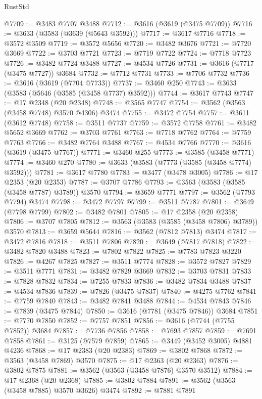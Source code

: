 \begin{lexlean}{RustStd}
\begin{coremodule}
{\begin{coremodule}
{{{{{{{{{{{{{{{{{{{{{{{{{{{{{{{{{{{{{{{{{{{{{@7709 := @3483 @7707 @3488
@7712 := @3616 (@3619 (@3475 @7709))
@7716 := @3633 (@3583 (@3639 (@5643 @3592)))
@7717 := @3617 @7716
@7718 := @3572 @3509
@7719 := @3572 @5656
@7720 := @3482 @3676
@7721 := @7720 @3669
@7722 := @3703 @7721
@7723 := @7719 @7722
@7724 := @7718 @7723
@7726 := @3482 @7724 @3488
@7727 := @4534 @7726
@7731 := @3616 (@7717 (@3475 @7727)) @3684
@7732 := @7712 @7731
@7733 := @7706 @7732
@7736 := @3616 (@3619 (@7704 @7733))
@7737 := @3460 @250
@7743 := @3633 (@3583 (@5646 (@3585 (@3458 @7737) @3592)))
@7744 := @3617 @7743
@7747 := @17 @2348 (@20 @2348)
@7748 := @3565 @7747
@7754 := @3562 (@3563 (@3458 @7748) @3570 @4306) @3474
@7755 := @3472 @7754
@7757 := @3611 (@3612 @7748)
@7758 := @3511 @7737
@7759 := @3572 @7758
@7761 := @3482 @5652 @3669
@7762 := @3703 @7761
@7763 := @7718 @7762
@7764 := @7759 @7763
@7766 := @3482 @7764 @3488
@7767 := @4534 @7766
@7770 := @3616 (@3619 (@3475 @7767))
@7771 := @3460 @255
@7773 := @3585 (@3458 @7771)
@7774 := @3460 @270
@7780 := @3633 (@3583 (@7773 (@3585 (@3458 @7774) @3592)))
@7781 := @3617 @7780
@7783 := @3477 (@3478 @3005)
@7786 := @17 @2353 (@20 @2353)
@7787 := @3707 @7786
@7793 := @3563 (@3583 (@3585 (@3458 @7787) @3789)) @3570
@7794 := @3659 @7771
@7797 := @3562 (@7793 @7794) @3474
@7798 := @3472 @7797
@7799 := @3511 @7787
@7801 := @3649 (@7798 @7799)
@7802 := @3482 @7801
@7805 := @17 @2358 (@20 @2358)
@7806 := @3707 @7805
@7812 := @3563 (@3583 (@3585 (@3458 @7806) @3789)) @3570
@7813 := @3659 @5644
@7816 := @3562 (@7812 @7813) @3474
@7817 := @3472 @7816
@7818 := @3511 @7806
@7820 := @3649 (@7817 @7818)
@7822 := @3482 @7820 @3488
@7823 := @7802 @7822
@7825 := @7783 @7823 @3220
@7826 := @4267 @7825
@7827 := @3511 @7774
@7828 := @3572 @7827
@7829 := @3511 @7771
@7831 := @3482 @7829 @3669
@7832 := @3703 @7831
@7833 := @7828 @7832
@7834 := @7255 @7833
@7836 := @3482 @7834 @3488
@7837 := @4534 @7836
@7839 := @7826 (@3475 @7837)
@7840 := @4275 @7762
@7841 := @7759 @7840
@7843 := @3482 @7841 @3488
@7844 := @4534 @7843
@7846 := @7839 (@3475 @7844)
@7850 := @3616 (@7781 (@3475 @7846)) @3684
@7851 := @7770 @7850
@7852 := @7757 @7851
@7856 := @3616 (@7744 (@7755 @7852)) @3684
@7857 := @7736 @7856
@7858 := @7693 @7857
@7859 := @7691 @7858
@7861 := @3125 (@7579 @7859)
@7865 := @3449 (@3452 @3005) @4881 @4236
@7868 := @17 @2383 (@20 @2383)
@7869 := @3802 @7868
@7872 := @3563 (@3458 @7869) @3570
@7875 := @17 @2363 (@20 @2363)
@7876 := @3802 @7875
@7881 := @3562 (@3563 (@3458 @7876) @3570 @3512)
@7884 := @17 @2368 (@20 @2368)
@7885 := @3802 @7884
@7891 := @3562 (@3563 (@3458 @7885) @3570 @3626) @3474
@7892 := @7881 @7891
}}}}}}}}}}}}}}}}}}}}}}}}}}}}}}}}}}}}}}}}}}}}}
\end{coremodule}}
\end{coremodule}
\end{lexlean}
